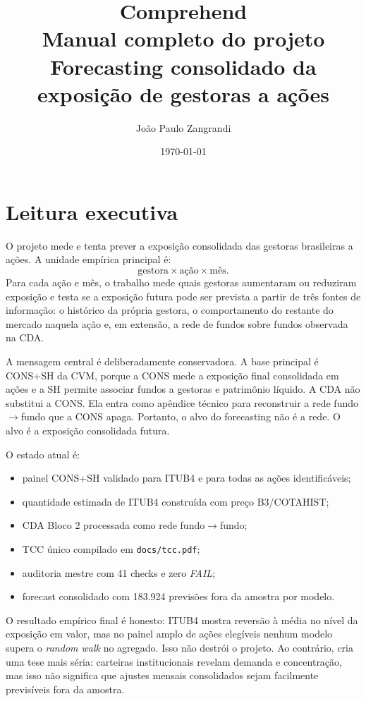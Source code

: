 \documentclass[11pt,a4paper]{article}
\title{\textbf{Comprehend}\\Manual completo do projeto\\
\large Forecasting consolidado da exposição de gestoras a ações}
\author{João Paulo Zangrandi}
\date{\today}
\begin{document}
\maketitle
\tableofcontents
\newpage

\section{Leitura executiva}

O projeto mede e tenta prever a exposição consolidada das gestoras brasileiras a ações. A unidade empírica
principal é:
\[
\text{gestora} \times \text{ação} \times \text{mês}.
\]
Para cada ação e mês, o trabalho mede quais gestoras aumentaram ou reduziram exposição e testa se a
exposição futura pode ser prevista a partir de três fontes de informação: o histórico da própria gestora, o
comportamento do restante do mercado naquela ação e, em extensão, a rede de fundos sobre fundos observada na
CDA.

A mensagem central é deliberadamente conservadora. A base principal é CONS+SH da CVM, porque a CONS mede a
exposição final consolidada em ações e a SH permite associar fundos a gestoras e patrimônio líquido. A CDA
não substitui a CONS. Ela entra como apêndice técnico para reconstruir a rede fundo$\to$fundo que a CONS
apaga. Portanto, o alvo do forecasting não é a rede. O alvo é a exposição consolidada futura.

O estado atual é:
\begin{itemize}
\item painel CONS+SH validado para ITUB4 e para todas as ações identificáveis;
\item quantidade estimada de ITUB4 construída com preço B3/COTAHIST;
\item CDA Bloco 2 processada como rede fundo$\to$fundo;
\item TCC único compilado em \texttt{docs/tcc.pdf};
\item auditoria mestre com 41 checks e zero \emph{FAIL};
\item forecast consolidado com 183.924 previsões fora da amostra por modelo.
\end{itemize}

O resultado empírico final é honesto: ITUB4 mostra reversão à média no nível da exposição em valor, mas no
painel amplo de ações elegíveis nenhum modelo supera o \emph{random walk} no agregado. Isso não destrói o
projeto. Ao contrário, cria uma tese mais séria: carteiras institucionais revelam demanda e concentração,
mas isso não significa que ajustes mensais consolidados sejam facilmente previsíveis fora da amostra.
\end{document}
